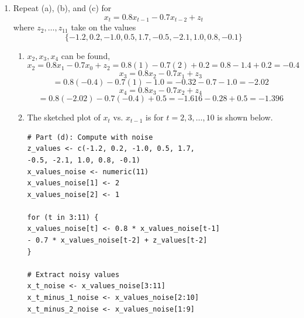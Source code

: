 \documentclass[12pt]{article}
\begin{document}
\begin{enumerate}
\begin{enumerate}
\begin{center}
        \end{center}
        \item Repeat (a), (b), and (c) for
        \[ x_t = 0.8x_{t-1} - 0.7x_{t-2} + z_t \]
        where $z_2, \ldots, z_{11}$ take on the values
        \[ 
        \{ -1.2, 0.2, -1.0, 0.5, 1.7, -0.5, -2.1, 1.0, 0.8, -0.1 \} 
        \]
        \begin{enumerate}
            \item $x_2, x_3, x_4$ can be found,
            \[ 
            x_2 = 0.8x_1 - 0.7x_0 + z_2 
            = 0.8(1) - 0.7(2) + 0.2
            = 0.8 - 1.4 + 0.2 = -0.4
            \]
            \[
            x_3 = 0.8x_2 - 0.7x_1 + z_3 
            \]
            \[
            = 0.8(-0.4) - 0.7(1) - 1.0
            = -0.32 - 0.7 - 1.0 = -2.02
            \]
            \[
            x_4 = 0.8x_3 - 0.7x_2 + z_4  
            \]
            \[
            = 0.8(-2.02) - 0.7(-0.4) + 0.5
            = -1.616 - 0.28 + 0.5 = -1.396
            \]
            \item The sketched plot of $x_t$ vs. $x_{t-1}$ is
            for $t = 2, 3, \ldots, 10$ is shown below.
\begin{verbatim}
# Part (d): Compute with noise
z_values <- c(-1.2, 0.2, -1.0, 0.5, 1.7, 
-0.5, -2.1, 1.0, 0.8, -0.1)
x_values_noise <- numeric(11)
x_values_noise[1] <- 2
x_values_noise[2] <- 1

for (t in 3:11) {
x_values_noise[t] <- 0.8 * x_values_noise[t-1] 
- 0.7 * x_values_noise[t-2] + z_values[t-2]
}

# Extract noisy values
x_t_noise <- x_values_noise[3:11]
x_t_minus_1_noise <- x_values_noise[2:10]
x_t_minus_2_noise <- x_values_noise[1:9]


\end{verbatim}
\end{enumerate}
\end{enumerate}
\end{enumerate}
\end{document}
